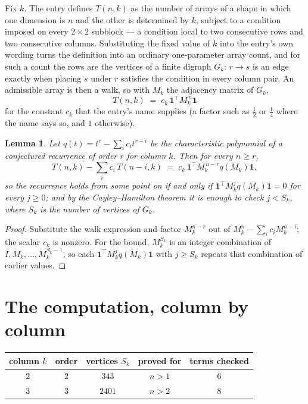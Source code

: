 \documentclass[11pt,a4paper]{article}
\theoremstyle{plain}
\newtheorem{lemma}[theorem]{Lemma}
\theoremstyle{definition}
\begin{document}
Fix $k$. The entry defines $T(n,k)$ as the number of arrays of a shape in which one dimension
is $n$ and the other is determined by $k$, subject to a condition imposed on every
$2\times2$ subblock --- a condition local to two consecutive rows and two consecutive columns.
Substituting the fixed value of $k$ into the entry's own wording turns the definition into an
ordinary one-parameter array count, and for such a count the rows are the vertices of a finite
digraph $G_k$: $r\to s$ is an edge exactly when placing $s$ under $r$ satisfies the condition
in every column pair. An admissible array is then a walk, so with $M_k$ the adjacency matrix
of $G_k$,
\[
T(n,k)\;=\;c_k\,\mathbf{1}^{\!\top}M_k^{\,n}\mathbf{1}
\]
for the constant $c_k$ that the entry's name supplies (a factor such as $\tfrac12$ or
$\tfrac14$ where the name says so, and $1$ otherwise).

\begin{lemma}\label{lem:crit}
Let $q(t)=t^{r}-\sum_i c_it^{r-i}$ be the characteristic polynomial of a conjectured
recurrence of order $r$ for column $k$. Then for every $n\ge r$,
\[
T(n,k)-\sum_i c_i\,T(n-i,k)\;=\;c_k\,\mathbf{1}^{\!\top}M_k^{\,n-r}q(M_k)\mathbf{1},
\]
so the recurrence holds from some point on if and only if
$\mathbf{1}^{\!\top}M_k^{j}q(M_k)\mathbf{1}=0$ for every $j\ge0$; and by the
Cayley--Hamilton theorem it is enough to check $j<S_k$, where $S_k$ is the number of vertices
of $G_k$.
\end{lemma}

\begin{proof}
Substitute the walk expression and factor $M_k^{n-r}$ out of $M_k^{n}-\sum_ic_iM_k^{n-i}$;
the scalar $c_k$ is nonzero. For the bound, $M_k^{S_k}$ is an integer combination of
$I,M_k,\dots,M_k^{S_k-1}$, so each $\mathbf{1}^{\!\top}M_k^{j}q(M_k)\mathbf{1}$ with
$j\ge S_k$ repeats that combination of earlier values.
\end{proof}

\section{The computation, column by column}

\begin{center}
\begin{tabular}{ccccc}
column $k$ & order & vertices $S_k$ & proved for & terms checked \\ \hline
$2$ & $2$ & $343$ & $n>1$ & $6$ \\
$3$ & $3$ & $2401$ & $n>2$ & $8$ \\
\end{tabular}
\end{center}
\end{document}
